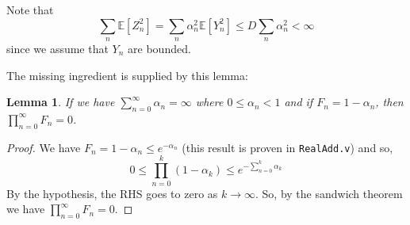 \documentclass{article}
\def\E{\mathbb{E}}
\newtheorem{lemma}[theorem]{Lemma}
\begin{document}
Note that $$\sum_n\E[Z_n^2] = \sum_n \alpha_n^2 \E[Y_n^2] \le D \sum_n \alpha_n^2 < \infty$$ since we assume that $Y_n$ are bounded. 

The missing ingredient is supplied by this lemma:
\begin{lemma}\label{thm:fprod}
If we have $\sum_{n=0}^\infty \alpha_n = \infty$ where $0 \le \alpha_n < 1$ and if $F_n = 1 - \alpha_n$, then $\prod_{n=0}^\infty F_n = 0$. 
\end{lemma}
\begin{proof}
    We have $F_n = 1 - \alpha_n \le e^{-\alpha_n}$ (this result is proven in \texttt {RealAdd.v}) and so,
    \[ 
    0 \le \prod_{n=0}^k (1 - \alpha_k) \le e^{- \sum_{n=0}^k \alpha_k}
    \]
    By the hypothesis, the RHS goes to zero as $k \to \infty$. So, by the sandwich theorem we have $\prod_{n=0}^\infty F_n = 0$. 
\end{proof}
\end{document}
